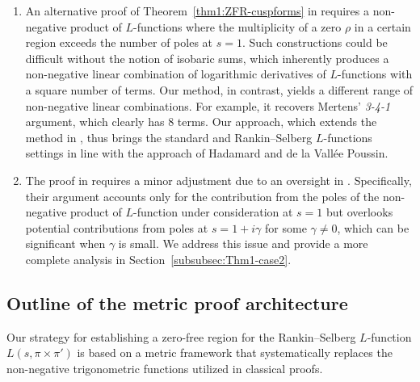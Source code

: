 \documentclass[12pt,reqno]{amsart}
\theoremstyle{remark}
\numberwithin{equation}{section}
\begin{document}
\begin{enumerate}
    
        \item An alternative proof of Theorem~\ref{thm1:ZFR-cuspforms} in \cite[Theorem 5.10]{IK} requires a non-negative product of $L$-functions where the multiplicity of a zero $\rho$ in a certain region exceeds the number of poles at $s = 1$. Such constructions could be difficult without the notion of isobaric sums, which inherently produces a non-negative linear combination of logarithmic derivatives of $L$-functions with a square number of terms.
        Our method, in contrast, yields a different range of non-negative linear combinations. 
        For example, it recovers Mertens' \textit{3-4-1} argument, which clearly has $8$ terms. Our approach, which extends the method in \cite[Theorem~8.3]{D}, thus brings the standard and Rankin--Selberg $L$-functions settings in line with the approach of Hadamard and de la Vall\'ee Poussin.
        
        

         \item  The proof in \cite[Theorem 5.10]{IK} requires a minor adjustment due to an oversight in \cite[ Lemma 5.9]{IK}. Specifically, their argument accounts only for the contribution from the poles of the non-negative product of $L$-function under consideration at $s =1$ but overlooks potential contributions from poles at $s= 1+i\gamma$ for some $\gamma \neq 0$, which can be significant when $\gamma$ is small. We address this issue and provide a more complete analysis in Section~\ref{subsubsec:Thm1-case2}.  
    \end{enumerate}

\subsection{Outline of the metric proof architecture}\label{subsec:outline-proof}
Our strategy for establishing a zero-free region for the Rankin--Selberg $L$-function $L(s, \pi \times \pi')$ is based on a metric framework that systematically replaces the non-negative trigonometric functions utilized in classical proofs.
\end{document}
